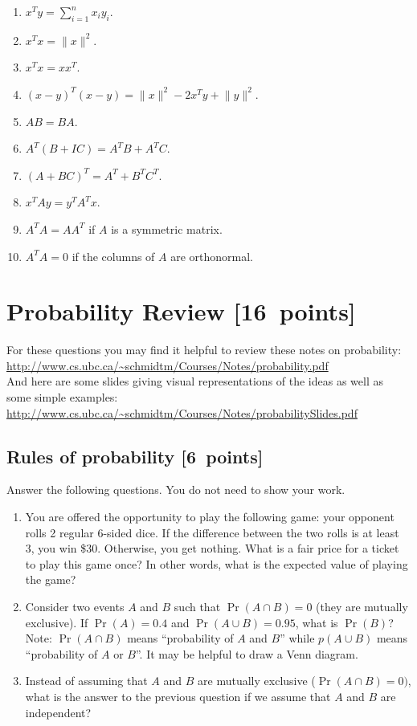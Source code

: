 \documentclass{article}
\newcommand{\blu}[1]{{\textcolor{blu}{#1}}}
\let\ask\blu
\newcommand\pts[1]{\textcolor{pointscolour}{[#1~points]}}
\newcommand{\norm}[1]{\lVert #1 \rVert}
\begin{document}
  \begin{enumerate}
  \item $x^Ty = \sum_{i=1}^n x_iy_i$.
  \item $x^Tx = \norm{x}^2$.
  \item $x^Tx = xx^T$.
  \item $(x-y)^T(x-y) = \norm{x}^2 - 2x^Ty + \norm{y}^2$.
  \item $AB=BA$.
  \item $A^T(B + IC) = A^TB + A^TC$.
  \item $(A + BC)^T = A^T + B^TC^T$.
  \item $x^TAy = y^TA^Tx$.
  \item $A^TA = AA^T$ if $A$ is a symmetric matrix.
  \item $A^TA = 0$ if the columns of $A$ are orthonormal.
  \end{enumerate}


  \clearpage\section{Probability Review \pts{16}}


  For these questions you may find it helpful to review these notes on probability:\\
  \url{http://www.cs.ubc.ca/~schmidtm/Courses/Notes/probability.pdf}\\
  And here are some slides giving visual representations of the ideas as well as some simple examples:\\
  \url{http://www.cs.ubc.ca/~schmidtm/Courses/Notes/probabilitySlides.pdf}

  \subsection{Rules of probability \pts{6}}

  \ask{Answer the following questions.} You do not need to show your work.

  \begin{enumerate}
  \item You are offered the opportunity to play the following game: your opponent rolls 2 regular 6-sided dice. If the difference between the two rolls is at least 3, you win \$30. Otherwise, you get nothing. What is a fair price for a ticket to play this game once? In other words, what is the expected value of playing the game?
  \item Consider two events $A$ and $B$ such that $\Pr(A \cap B)=0$ (they are mutually exclusive). If $\Pr(A) = 0.4$ and $\Pr(A \cup B) = 0.95$, what is $\Pr(B)$? Note: $\Pr(A \cap B)$ means
  ``probability of $A$ and $B$'' while $p(A \cup B)$ means ``probability of $A$ or $B$''. It may be helpful to draw a Venn diagram.
  \item Instead of assuming that $A$ and $B$ are mutually exclusive ($\Pr(A \cap B) = 0)$, what is the answer to the previous question if we assume that $A$ and $B$ are independent?


  \end{enumerate}
\end{document}
